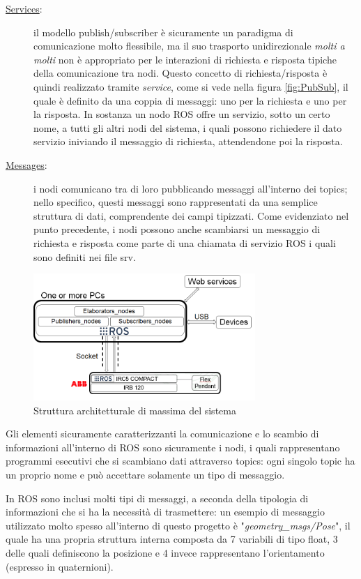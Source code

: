 \begin{description}
	\item[\underline{Services}:] il modello publish/subscriber è sicuramente un paradigma di comunicazione molto flessibile, ma il suo trasporto unidirezionale \emph{molti a molti} non è appropriato per le interazioni di richiesta e risposta tipiche della comunicazione tra nodi. Questo concetto di richiesta/risposta è quindi realizzato tramite \emph{service}, come si vede nella figura \ref{fig:PubSub}, il quale è definito da una coppia di messaggi: uno per la richiesta e uno per la risposta.
	In sostanza un nodo ROS offre un servizio, sotto un certo nome, a tutti gli altri nodi del sistema, i quali possono richiedere il dato servizio iniviando il messaggio di richiesta, attendendone poi la risposta.
	\item[\underline{Messages}:] i nodi comunicano tra di loro pubblicando messaggi all'interno dei topics; nello specifico, questi messaggi sono rappresentati da una semplice struttura di dati, comprendente dei campi tipizzati. Come evidenziato nel punto precedente, i nodi possono anche scambiarsi un messaggio di richiesta e risposta come parte di una chiamata di servizio ROS i quali  sono definiti nei file srv. 
\end{description}
\begin{figure}[h]
	\centering
	\includegraphics[width=0.75\textwidth]{Immagini/ROS_UniBG_Structure}
	\caption{Struttura architetturale di massima del sistema}
	\label{fig:ROS-UniBG}
\end{figure}
Gli elementi sicuramente caratterizzanti la comunicazione e lo scambio di informazioni all'interno di ROS sono sicuramente i nodi, i quali rappresentano programmi esecutivi che si scambiano dati attraverso topics: ogni singolo topic ha un proprio nome e può accettare solamente un tipo di messaggio.

In ROS sono inclusi molti tipi di messaggi, a seconda della tipologia di informazioni che si ha la necessità di trasmettere: un esempio di messaggio utilizzato molto spesso all'interno di questo progetto è "\emph{geometry\_msgs/Pose}", il quale ha una propria struttura interna composta da 7 variabili di tipo float, 3 delle quali definiscono la posizione e 4 invece rappresentano l'orientamento (espresso in quaternioni).

